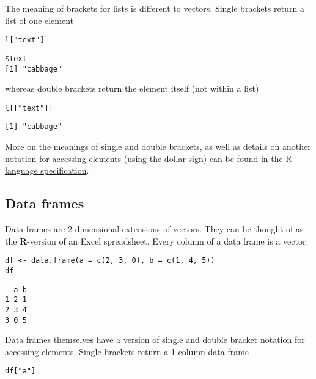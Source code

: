 \documentclass[11pt,a4paper]{article}
\begin{document}
The meaning of brackets for lists is different to vectors. Single brackets return a list of one element \\

\begin{verbatim}
l["text"]
\end{verbatim}

\begin{verbatim}
$text
[1] "cabbage"
\end{verbatim}

whereas double brackets return the element itself (not within a list) \\

\begin{verbatim}
l[["text"]]
\end{verbatim}

\begin{verbatim}
[1] "cabbage"
\end{verbatim}

More on the meanings of single and double brackets, as well as details on another notation for accessing elements (using the dollar sign) can be found in the \href{http://cran.r-project.org/doc/manuals/R-lang.html#Indexing}{R language specification}. \\

\subsection{Data frames}
\label{sec-2-3}

Data frames are 2-dimensional extensions of vectors. They can be thought of as the \textbf{R}-version of an Excel spreadsheet. Every column of a data frame is a vector. \\

\begin{verbatim}
df <- data.frame(a = c(2, 3, 0), b = c(1, 4, 5))
df
\end{verbatim}

\begin{verbatim}
  a b
1 2 1
2 3 4
3 0 5
\end{verbatim}

Data frames themselves have a version of single and double bracket notation for accessing elements. Single brackets return a 1-column data frame \\

\begin{verbatim}
df["a"]
\end{verbatim}
\end{document}
